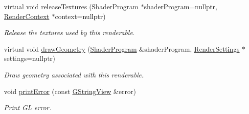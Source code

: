 \begin{Indent}
\begin{DoxyCompactItemize}
virtual void \mbox{\hyperlink{classrev_1_1_renderable_aa1b81e9f1e89909f7a7c5e7122d031d9}{release\+Textures}} (\mbox{\hyperlink{classrev_1_1_shader_program}{Shader\+Program}} $\ast$shader\+Program=nullptr, \mbox{\hyperlink{classrev_1_1_render_context}{Render\+Context}} $\ast$context=nullptr)
\begin{DoxyCompactList}\small\item\em Release the textures used by this renderable. \end{DoxyCompactList}\item 
\mbox{\label{classrev_1_1_renderable_acc6965aa24276111faf6046865e2e722}} 
virtual void \mbox{\hyperlink{classrev_1_1_renderable_acc6965aa24276111faf6046865e2e722}{draw\+Geometry}} (\mbox{\hyperlink{classrev_1_1_shader_program}{Shader\+Program}} \&shader\+Program, \mbox{\hyperlink{classrev_1_1_render_settings}{Render\+Settings}} $\ast$settings=nullptr)
\begin{DoxyCompactList}\small\item\em Draw geometry associated with this renderable. \end{DoxyCompactList}\item 
\mbox{\label{classrev_1_1_renderable_aaa0043cabf448307e58669f7e70c4351}} 
void \mbox{\hyperlink{classrev_1_1_renderable_aaa0043cabf448307e58669f7e70c4351}{print\+Error}} (const \mbox{\hyperlink{classrev_1_1_g_string_view}{G\+String\+View}} \&error)
\begin{DoxyCompactList}\small\item\em Print GL error. \end{DoxyCompactList}\end{DoxyCompactItemize}
\end{Indent}
